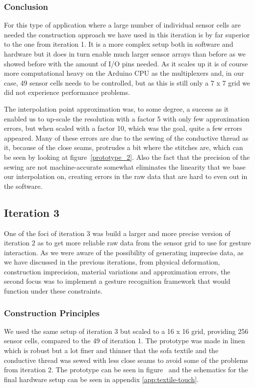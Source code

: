 \subsubsection{Conclusion}
For this type of application where a large number of individual sensor cells are needed the construction approach we have used in this iteration is by far superior to the one from iteration 1.
It is a more complex setup both in software and hardware but it does in turn enable much larger sensor arrays than before as we showed before with the amount of I/O pins needed.
As it scales up it is of course more computational heavy on the Arduino CPU as the multiplexers and, in our case, 49 sensor cells needs to be controlled, but as this is still only a 7 x 7 grid we did not experience performance problems.

The interpolation point approximation was, to some degree, a success as it enabled us to up-scale the resolution with a factor 5 with only few approximation errors, but when scaled with a factor 10, which was the goal, quite a few errors appeared.
Many of these errors are due to the sewing of the conductive thread as it, because of the close seams, protrudes a bit where the stitches are, which can be seen by looking at figure~\ref{prototype_2}.
Also the fact that the precision of the sewing are not machine-accurate somewhat eliminates the linearity that we base our interpolation on, creating errors in the raw data that are hard to even out in the software.

\subsection{Iteration 3}
\label{ch:textiletouch:iteration3}
One of the foci of iteration 3 was build a larger and more precise version of iteration 2 as to get more reliable raw data from the sensor grid to use for gesture interaction.
As we were aware of the possibility of generating imprecise data, as we have discussed in the previous iterations, from physical deformation, construction imprecision, material variations and approximation errors, the second focus was to implement a gesture recognition framework that would function under these constraints.

\subsubsection{Construction Principles}
We used the same setup of iteration 3 but scaled to a 16 x 16 grid, providing 256 sensor cells, compared to the 49 of iteration 1.
The prototype was made in linen which is robust but a lot finer and thinner that the sofa textile and the conductive thread was sewed with less close seams to avoid some of the problems from iteration 2.
The prototype can be seen in figure~ and the schematics for the final hardware setup can be seen in appendix \ref{app:textile-touch}.

